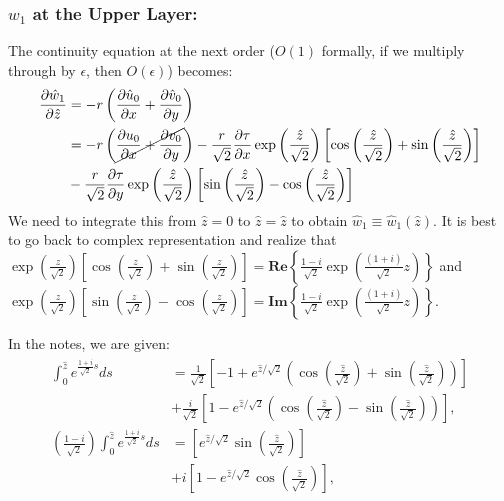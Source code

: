 \documentclass{article}
\newcommand{\pd}[2]{\frac{\partial{#1}}{\partial{#2}}}
\begin{document}
\subsubsection{$w_{1}$ at the Upper Layer:}
The continuity equation at the next order ($O(1)$ formally, if we multiply through by $\epsilon$, then $O(\epsilon)$) becomes:
\begin{align}
 \begin{split}
  \pd{\hat{w}_{1}}{\hat{z}} &= -r\left(\pd{\hat{u}_{0}}{x} + \pd{\hat{v}_{0}}{y} \right)\\
  &= -r\left(\cancel{\pd{u_{0}}{x} + \pd{v_{0}}{y} }\right) - \frac{r}{\sqrt{2}}\pd{\tau}{x} \exp{\left(\frac{\hat{z}}{\sqrt{2}}\right)}\left[\cos{\left(\frac{\hat{z}}{\sqrt{2}} \right)} + \sin{\left(\frac{\hat{z}}{\sqrt{2}} \right)} \right]\\
  &-\frac{r}{\sqrt{2}}\pd{\tau}{y} \exp{\left(\frac{\hat{z}}{\sqrt{2}}\right)} \left[\sin{\left(\frac{\hat{z}}{\sqrt{2}} \right)} - \cos{\left(\frac{\hat{z}}{\sqrt{2}} \right)} \right]\\
 \end{split}
\end{align}
%
We need to integrate this from $\hat{z} = 0$ to $\hat{z} = \hat{z}$ to obtain $\hat{w}_{1}\equiv \hat{w}_{1}(\hat{z})$. It is best to go back to complex representation and realize that $\exp{\left(\frac{z}{\sqrt{2}}\right)}\left[\cos{\left(\frac{z}{\sqrt{2}} \right)} + \sin{\left(\frac{z}{\sqrt{2}} \right)} \right] = \mathbf{Re}\left\{\frac{1-i}{\sqrt{2}}\exp{\left(\frac{(1+i)}{\sqrt{2}}z\right)} \right\} $ and $\exp{\left(\frac{z}{\sqrt{2}}\right)} \left[\sin{\left(\frac{z}{\sqrt{2}} \right)} - \cos{\left(\frac{z}{\sqrt{2}} \right)} \right] = \mathbf{Im}\left\{\frac{1-i}{\sqrt{2}}\exp{\left(\frac{(1+i)}{\sqrt{2}}z\right)} \right\}$.

In the notes, we are given: 
\begin{align}\label{eq:given_integration}
 \begin{split}
   \int_{0}^{\hat{z}} e^{\frac{1+i}{\sqrt{2}} s} ds &= \frac{1}{\sqrt{2}} \left[ -1 + e^{\hat{z}/\sqrt{2}} \left(\cos{\left(\frac{\hat{z}}{\sqrt{2}} \right)} + \sin{\left(\frac{\hat{z}}{\sqrt{2}}\right)} \right) \right]\\
   & + \frac{i}{\sqrt{2}} \left[ 1 - e^{\hat{z}/\sqrt{2}} \left(\cos{\left(\frac{\hat{z}}{\sqrt{2}} \right)} - \sin{\left(\frac{\hat{z}}{\sqrt{2}}\right)} \right) \right], \\
   \left(\frac{1-i}{\sqrt{2}}\right)\int_{0}^{\hat{z}} e^{\frac{1+i}{\sqrt{2}} s} ds &= \left[ e^{\hat{z}/\sqrt{2}} \sin{\left(\frac{\hat{z}}{\sqrt{2}}\right)}  \right]\\
   & + i\left[ 1 - e^{\hat{z}/\sqrt{2}} \cos{\left(\frac{\hat{z}}{\sqrt{2}}\right)}  \right], \\
 \end{split}
\end{align}
\end{document}
